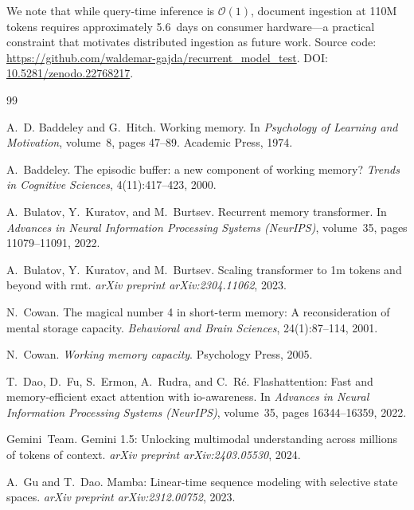 \documentclass[11pt,a4paper]{article}
\begin{document}
We note that while query-time inference is $\mathcal{O}(1)$, document ingestion at 110M tokens requires approximately 5.6~days on consumer hardware---a practical constraint that motivates distributed ingestion as future work. Source code: \url{https://github.com/waldemar-gajda/recurrent_model_test}. DOI: \href{https://doi.org/10.5281/zenodo.22768217}{10.5281/zenodo.22768217}.

\begin{thebibliography}{99}

A.~D. Baddeley and G.~Hitch.
\newblock Working memory.
\newblock In \emph{Psychology of Learning and Motivation}, volume~8, pages 47--89. Academic Press, 1974.

A.~Baddeley.
\newblock The episodic buffer: a new component of working memory?
\newblock \emph{Trends in Cognitive Sciences}, 4(11):417--423, 2000.

A.~Bulatov, Y.~Kuratov, and M.~Burtsev.
\newblock Recurrent memory transformer.
\newblock In \emph{Advances in Neural Information Processing Systems (NeurIPS)}, volume~35, pages 11079--11091, 2022.

A.~Bulatov, Y.~Kuratov, and M.~Burtsev.
\newblock Scaling transformer to 1m tokens and beyond with rmt.
\newblock \emph{arXiv preprint arXiv:2304.11062}, 2023.

N.~Cowan.
\newblock The magical number 4 in short-term memory: A reconsideration of mental storage capacity.
\newblock \emph{Behavioral and Brain Sciences}, 24(1):87--114, 2001.

N.~Cowan.
\newblock \emph{Working memory capacity}.
\newblock Psychology Press, 2005.

T.~Dao, D.~Fu, S.~Ermon, A.~Rudra, and C.~R{\'e}.
\newblock Flashattention: Fast and memory-efficient exact attention with io-awareness.
\newblock In \emph{Advances in Neural Information Processing Systems (NeurIPS)}, volume~35, pages 16344--16359, 2022.

Gemini~Team.
\newblock Gemini 1.5: Unlocking multimodal understanding across millions of tokens of context.
\newblock \emph{arXiv preprint arXiv:2403.05530}, 2024.

A.~Gu and T.~Dao.
\newblock Mamba: Linear-time sequence modeling with selective state spaces.
\newblock \emph{arXiv preprint arXiv:2312.00752}, 2023.


\end{thebibliography}
\end{document}
